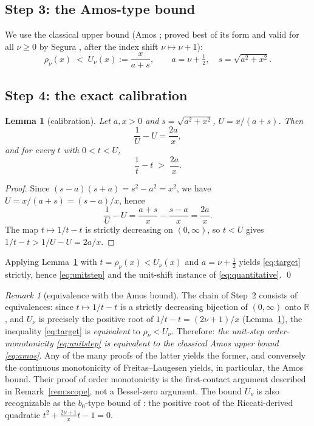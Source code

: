 \documentclass[11pt]{article}
\newtheorem{lemma}[theorem]{Lemma}
\theoremstyle{remark}
\newtheorem{remark}[theorem]{Remark}
\begin{document}
\subsection*{Step 3: the Amos-type bound}

We use the classical upper bound (Amos \cite{Amos}; proved best of its
form and valid for all $\nu \ge 0$ by Segura
\cite[Thm.~2]{RuizSegura}, after the index shift $\nu \mapsto \nu+1$):
\begin{equation}
\label{eq:amos}
\rho_\nu(x) \;<\; U_\nu(x) := \frac{x}{a + s},
\qquad a = \nu + \tfrac12,\quad s = \sqrt{a^2 + x^2}.
\end{equation}

\subsection*{Step 4: the exact calibration}

\begin{lemma}[calibration]
\label{lem:calibration}
Let $a, x > 0$ and $s = \sqrt{a^2+x^2}$, $U = x/(a+s)$. Then
\[
\frac{1}{U} - U = \frac{2a}{x},
\]
and for every $t$ with $0 < t < U$,
\[
\frac{1}{t} - t \;>\; \frac{2a}{x}.
\]
\end{lemma}

\begin{proof}
Since $(s-a)(s+a) = s^2 - a^2 = x^2$, we have
$U = x/(a+s) = (s-a)/x$, hence
\[
\frac1U - U = \frac{a+s}{x} - \frac{s-a}{x} = \frac{2a}{x}.
\]
The map $t \mapsto 1/t - t$ is strictly decreasing on $(0,\infty)$, so
$t < U$ gives $1/t - t > 1/U - U = 2a/x$.
\end{proof}

Applying Lemma~\ref{lem:calibration} with $t = \rho_\nu(x) < U_\nu(x)$
and $a = \nu + \frac12$ yields \eqref{eq:target} strictly, hence
\eqref{eq:unitstep} and the unit-shift instance of
\eqref{eq:quantitative}. \qed

\begin{remark}[equivalence with the Amos bound]
\label{rem:equivalence}
The chain of Step~2 consists of equivalences: since
$t \mapsto 1/t - t$ is a strictly decreasing bijection of $(0,\infty)$
onto $\mathbb{R}$, and $U_\nu$ is precisely the positive root of
$1/t - t = (2\nu+1)/x$ (Lemma~\ref{lem:calibration}), the inequality
\eqref{eq:target} is \emph{equivalent} to $\rho_\nu < U_\nu$.
Therefore: \emph{the unit-step order-monotonicity \eqref{eq:unitstep}
is equivalent to the classical Amos upper bound \eqref{eq:amos}}. Any
of the many proofs of the latter \cite{Amos, Segura2011, HornikGrun,
RuizSegura} yields the former, and conversely the continuous
monotonicity of Freitas--Laugesen \cite{FreitasLaugesen} yields, in
particular, the Amos bound.  Their proof of order monotonicity is the
first-contact argument described in Remark~\ref{rem:scope}, not a
Bessel-zero argument. The bound $U_\nu$
is also recognizable as the $b_0$-type bound of \cite{Segura2011}: the
positive root of the Riccati-derived quadratic
$t^2 + \frac{2\nu+1}{x}t - 1 = 0$.
\end{remark}
\end{document}
